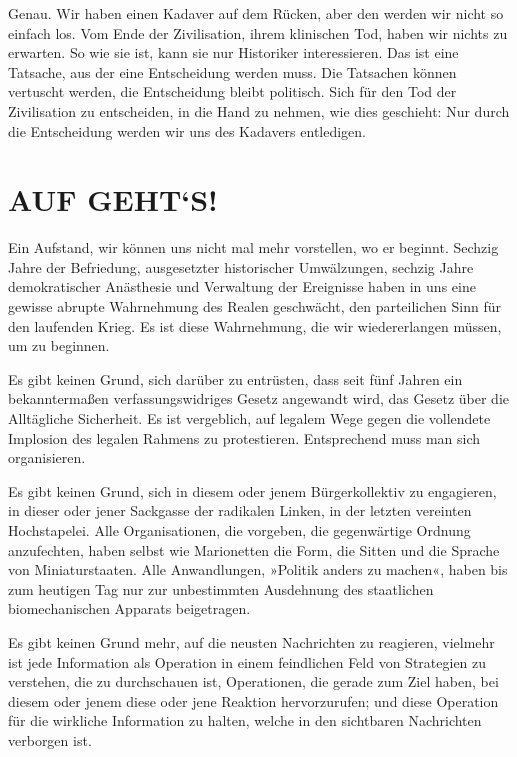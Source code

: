Genau. Wir haben einen Kadaver auf dem Rücken, aber den werden wir
nicht so einfach los. Vom Ende der Zivilisation, ihrem klinischen
Tod, haben wir nichts zu erwarten. So wie sie ist, kann sie nur
Historiker interessieren. Das ist eine Tatsache, aus der eine
Entscheidung werden muss. Die Tatsachen können vertuscht werden,
die Entscheidung bleibt politisch. Sich für den Tod der
Zivilisation zu entscheiden, in die Hand zu nehmen, wie dies
geschieht: Nur durch die Entscheidung werden wir uns des Kadavers
entledigen.

\section{AUF GEHT‘S!}

Ein Aufstand, wir können uns nicht mal mehr vorstellen, wo er
beginnt. Sechzig Jahre der Befriedung, ausgesetzter historischer
Umwälzungen, sechzig Jahre demokratischer Anästhesie und Verwaltung
der Ereignisse haben in uns eine gewisse abrupte Wahrnehmung des
Realen geschwächt, den parteilichen Sinn für den laufenden Krieg.
Es ist diese Wahrnehmung, die wir wiedererlangen müssen, um zu
beginnen.
\extrapar{}

Es gibt keinen Grund, sich darüber zu entrüsten, dass seit fünf
Jahren ein bekanntermaßen verfassungswidriges Gesetz angewandt
wird, das Gesetz über die Alltägliche Sicherheit. Es ist
vergeblich, auf legalem Wege gegen die vollendete Implosion des
legalen Rahmens zu protestieren. Entsprechend muss man sich
organisieren.
\extrapar{}

Es gibt keinen Grund, sich in diesem oder jenem Bürgerkollektiv zu
engagieren, in dieser oder jener Sackgasse der radikalen Linken, in
der letzten vereinten Hochstapelei. Alle Organisationen, die
vorgeben, die gegenwärtige Ordnung anzufechten, haben selbst wie
Marionetten die Form, die Sitten und die Sprache von
Miniaturstaaten. Alle Anwandlungen, »Politik anders zu machen«,
haben bis zum heutigen Tag nur zur unbestimmten Ausdehnung des
staatlichen biomechanischen Apparats beigetragen.
\extrapar{}

Es gibt keinen Grund mehr, auf die neusten Nachrichten zu
reagieren, vielmehr ist jede Information als Operation in einem
feindlichen Feld von Strategien zu verstehen, die zu durchschauen
ist, Operationen, die gerade zum Ziel haben, bei diesem oder jenem
diese oder jene Reaktion hervorzurufen; und diese Operation für die
wirkliche Information zu halten, welche in den sichtbaren
Nachrichten verborgen ist.
\extrapar{}

